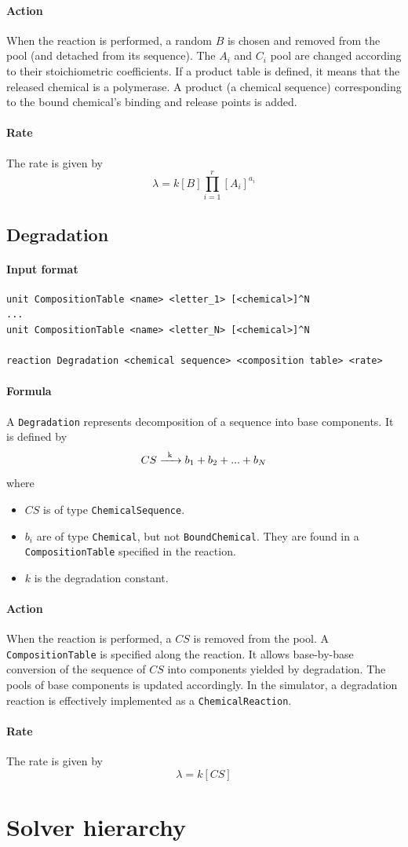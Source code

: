 \documentclass[12pt]{article}
\theoremstyle{definition}
\theoremstyle{remark}
\numberwithin{equation}{section}
\newcommand{\reactionIrr}[4]{#1 \ce{->[#3][#4]} #2}
\begin{document}
\paragraph{Action} When the reaction is performed, a random $B$ is chosen and removed from the pool (and detached from its sequence). The $A_i$ and $C_i$ pool are changed according to their stoichiometric coefficients. If a product table is defined, it means that the released chemical is a polymerase. A product (a chemical sequence) corresponding to the bound chemical's binding and release points is added.

\paragraph{Rate} The rate is given by
$$
	\lambda = k[B]\prod\limits_{i=1}^{r}[A_i]^{a_i}
$$

\subsection{Degradation}
\paragraph{Input format}
\begin{verbatim}
unit CompositionTable <name> <letter_1> [<chemical>]^N
...
unit CompositionTable <name> <letter_N> [<chemical>]^N

reaction Degradation <chemical sequence> <composition table> <rate>	
\end{verbatim}

\paragraph{Formula} A \texttt{Degradation} represents decomposition of a sequence into base components. It is defined by
$$
	\reactionIrr{CS}{b_1 + b_2 + ... + b_N}{k}{}
$$
where
\begin{itemize}
	\item $CS$ is of type \texttt{ChemicalSequence}.
	\item $b_i$ are of type \texttt{Chemical}, but not \texttt{BoundChemical}. They are found in a \texttt{CompositionTable} specified in the reaction.
	\item $k$ is the degradation constant.
\end{itemize}

\paragraph{Action} When the reaction is performed, a $CS$ is removed from the pool. A \texttt{CompositionTable} is specified along the reaction. It allows base-by-base conversion of the sequence of $CS$ into components yielded by degradation. The pools of base components is updated accordingly. In the simulator, a degradation reaction is effectively implemented as a \texttt{ChemicalReaction}.

\paragraph{Rate} The rate is given by
$$
	\lambda = k [CS]
$$


\section{Solver hierarchy}
\end{document}
